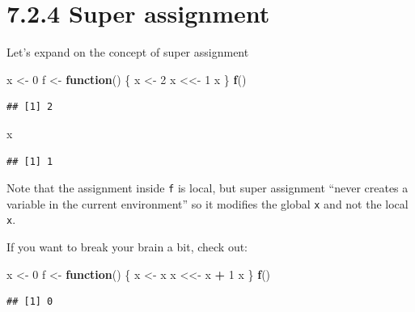 \documentclass[]{book}
\newenvironment{Shaded}{\begin{snugshade}}{\end{snugshade}}
\newcommand{\ControlFlowTok}[1]{\textcolor[rgb]{0.13,0.29,0.53}{\textbf{#1}}}
\newcommand{\DecValTok}[1]{\textcolor[rgb]{0.00,0.00,0.81}{#1}}
\newcommand{\KeywordTok}[1]{\textcolor[rgb]{0.13,0.29,0.53}{\textbf{#1}}}
\newcommand{\NormalTok}[1]{#1}
\newcommand{\OperatorTok}[1]{\textcolor[rgb]{0.81,0.36,0.00}{\textbf{#1}}}
\newcommand{\StringTok}[1]{\textcolor[rgb]{0.31,0.60,0.02}{#1}}
\begin{document}
\hypertarget{super-assignment}{%
\section*{7.2.4 Super assignment}\label{super-assignment}}

Let's expand on the concept of super assignment

\begin{Shaded}
\begin{Highlighting}[]
\NormalTok{x <-}\StringTok{ }\DecValTok{0}
\NormalTok{f <-}\StringTok{ }\ControlFlowTok{function}\NormalTok{() \{}
\NormalTok{  x <-}\StringTok{ }\DecValTok{2}
\NormalTok{  x <<-}\StringTok{ }\DecValTok{1}
\NormalTok{  x}
\NormalTok{\}}
\KeywordTok{f}\NormalTok{()}
\end{Highlighting}
\end{Shaded}

\begin{verbatim}
## [1] 2
\end{verbatim}

\begin{Shaded}
\begin{Highlighting}[]
\NormalTok{x}
\end{Highlighting}
\end{Shaded}

\begin{verbatim}
## [1] 1
\end{verbatim}

Note that the assignment inside \texttt{f} is local, but super assignment ``never creates a variable in the current environment'' so it modifies the global \texttt{x} and not the local \texttt{x}.

If you want to break your brain a bit, check out:

\begin{Shaded}
\begin{Highlighting}[]
\NormalTok{x <-}\StringTok{ }\DecValTok{0}
\NormalTok{f <-}\StringTok{ }\ControlFlowTok{function}\NormalTok{() \{}
\NormalTok{  x <-}\StringTok{ }\NormalTok{x}
\NormalTok{  x <<-}\StringTok{ }\NormalTok{x }\OperatorTok{+}\StringTok{ }\DecValTok{1}
\NormalTok{  x}
\NormalTok{\}}
\KeywordTok{f}\NormalTok{()}
\end{Highlighting}
\end{Shaded}

\begin{verbatim}
## [1] 0
\end{verbatim}
\end{document}

